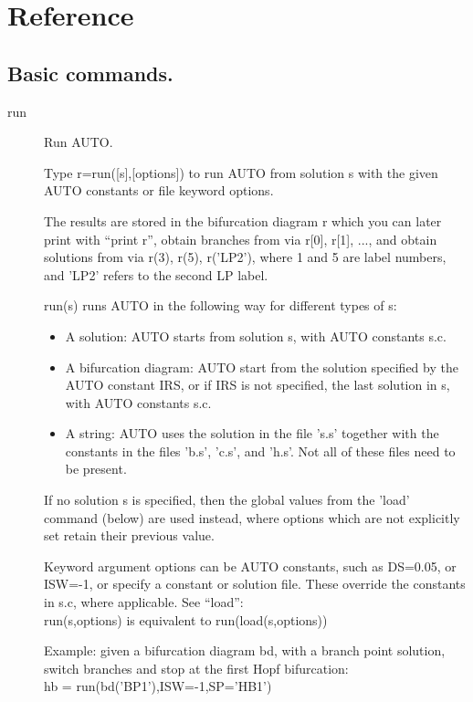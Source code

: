 \documentclass[12pt]{report}
\begin{document}
\section{ Reference }  \label{sec:clui reference}
\subsection{Basic commands.} \label{sec:clui_ref_basic}
\begin{description}
\item[run]
Run AUTO.

    Type r=run([s],[options]) to run AUTO from solution s with the given
    AUTO constants or file keyword options.
    
    The results are stored in the bifurcation diagram r which you can
    later print with ``print r'', obtain branches from via r[0], r[1], ...,
    and obtain solutions from via r(3), r(5), r('LP2'), where 1 and 5
    are label numbers, and 'LP2' refers to the second LP label.

    run(s) runs AUTO in the following way for different types of s:
    \begin{itemize}
    \item
      A solution: AUTO starts from solution s, with AUTO constants s.c.
    \item
      A bifurcation diagram: AUTO start from the solution specified by
      the AUTO constant IRS, or if IRS is not specified, the last solution
      in s, with AUTO constants s.c.
    \item
      A string: AUTO uses the solution in the file 's.s' together with the
      constants in the files 'b.s', 'c.s', and 'h.s'. Not all of these
      files need to be present.
    \end{itemize}

    If no solution s is specified, then the global values from the
    'load' command (below) are used instead, where
    options which are not explicitly set retain their previous value.

    Keyword argument options can be AUTO constants, such as DS=0.05,
    or ISW=-1, or specify a constant or solution file. These override
    the constants in s.c, where applicable. See ``load'':\\
    run(s,options) is equivalent to run(load(s,options))

    Example: given a bifurcation diagram bd, with a branch point
    solution, switch branches and stop at the first Hopf bifurcation:\\
    hb = run(bd('BP1'),ISW=-1,SP='HB1')
    

\end{description}
\end{document}
